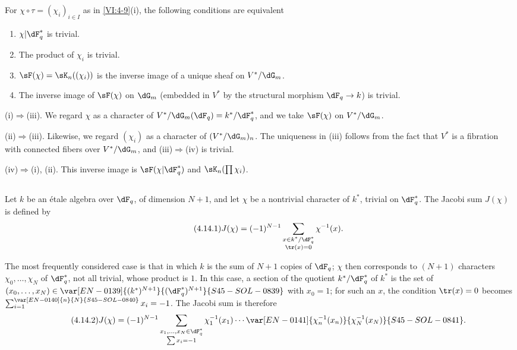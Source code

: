 \begin{lemma_}\label{VI:4-13}
For $\chi\circ \tau=(\chi_i)_{i\in I}$ as in \ref{VI:4-9}(i), the
following conditions are equivalent 
\begin{enumerate}[\indent (i)]
  \item $\chi| \dF_q^\ast$ is trivial. 
  \item The product of $\chi_i$ is trivial. 
  \item $\sF(\chi) = \sK_n((\chi_i))$ is the inverse image of a unique 
    sheaf on $V^\ast/\dG_m$. 
  \item The inverse image of $\sF(\chi)$ on $\dG_m$ (embedded in 
    $V^\ast$ by the structural morphism $\dF_q \to k$) is trivial. 
\end{enumerate}
\end{lemma_}

(i)$\Rightarrow$(iii). We regard $\chi$ as a character of 
$V^\ast/\dG_m(\dF_q)=k^\ast/\dF_q^\ast$, and we take $\sF(\chi)$ on 
$V^\ast/\dG_m$. 

(ii)$\Rightarrow$(iii). Likewise, we regard $(\chi_i)$ as a character 
of $(V^\ast/\dG_m)_n$. The uniqueness in (iii) follows from the fact that $V^\ast$ is 
a fibration with connected fibers over $V^\ast/\dG_m$, and (iii)$\Rightarrow$(iv)  
is trivial. 

(iv)$\Rightarrow$(i), (ii). This inverse image is 
$\sF(\chi|\dF_q^\ast)$ and $\sK_n(\prod \chi_i)$. 





\subsection{}\label{VI:4-14}

Let $k$ be an étale algebra over $\dF_q$, of 
dimension $N+1$, and let $\chi$ be a nontrivial character of $k^\ast$, trivial on 
$\dF_q^\ast$. The Jacobi sum $J(\chi)$ is defined by 
\begin{equation*}\tag{4.14.1}\label{VI:eq:4-14-1}
  J(\chi) = (-1)^{N-1} \sum_{\substack{x\in k^\ast/\dF_q^\ast \\ \tr(x)=0}} \chi^{-1}(x) \text{.} 
\end{equation*}

The most frequently considered case is that in which $k$ is the sum of $N+1$
copies of $\dF_q$; $\chi$ then corresponds to $(N+1)$ characters
$\chi_0,\ldots,\chi_N$ of $\dF_q^\ast$, not all trivial, whose product is $1$.
In this case, a section of the quotient $k^\ast/\dF_q^\ast$ of $k^\ast$
is the set of $(x_0,\ldots,x_N)\in\var[EN-0139]{(k^\ast)^{N+1}}{(\dF_q^\ast)^{N+1}}{S45-SOL-0839}$ with $x_0=1$;
for such an $x$, the condition $\tr(x)=0$ becomes $\sum_{i=1}^{\var[EN-0140]{n}{N}{S45-SOL-0840}}x_i=-1$.
The Jacobi sum is therefore
\begin{equation*}\tag{4.14.2}\label{VI:eq:4-14-2}
 J(\chi)=(-1)^{N-1}\sum_{\substack{x_1,\ldots,x_N\in\dF_q^\ast\\\sum x_i=-1}}
 \chi_1^{-1}(x_1)\cdots\var[EN-0141]{\chi_n^{-1}(x_n)}{\chi_N^{-1}(x_N)}{S45-SOL-0841} \text{.}
\end{equation*}

